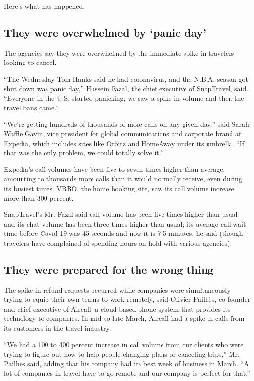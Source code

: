 Here's what has happened.

\hypertarget{they-were-overwhelmed-by-panic-day}{%
\subsection{They were overwhelmed by `panic
day'}\label{they-were-overwhelmed-by-panic-day}}

The agencies say they were overwhelmed by the immediate spike in
travelers looking to cancel.

``The Wednesday Tom Hanks said he had coronavirus, and the N.B.A. season
got shut down was panic day,'' Hussein Fazal, the chief executive of
SnapTravel, said. ``Everyone in the U.S. started panicking, we saw a
spike in volume and then the travel bans came.''

``We're getting hundreds of thousands of more calls on any given day,''
said Sarah Waffle Gavin, vice president for global communications and
corporate brand at Expedia, which includes sites like Orbitz and
HomeAway under its umbrella. ``If that was the only problem, we could
totally solve it.''

Expedia's call volumes have been five to seven times higher than
average, amounting to thousands more calls than it would normally
receive, even during its busiest times. VRBO, the home booking site, saw
its call volume increase more than 300 percent.

SnapTravel's Mr. Fazal said call volume has been five times higher than
usual and its chat volume has been three times higher than usual; its
average call wait time before Covid-19 was 45 seconds and now it is 7.5
minutes, he said (though travelers have complained of spending hours on
hold with various agencies).

\hypertarget{they-were-prepared-for-the-wrong-thing}{%
\subsection{They were prepared for the wrong
thing}\label{they-were-prepared-for-the-wrong-thing}}

The spike in refund requests occurred while companies were
simultaneously trying to equip their own teams to work remotely, said
Olivier Pailhès, co-founder and chief executive of Aircall, a
cloud-based phone system that provides its technology to companies. In
mid-to-late March, Aircall had a spike in calls from its customers in
the travel industry.

``We had a 100 to 400 percent increase in call volume from our clients
who were trying to figure out how to help people changing plans or
canceling trips,'' Mr. Pailhes said, adding that his company had its
best week of business in March. ``A lot of companies in travel have to
go remote and our company is perfect for that.''

